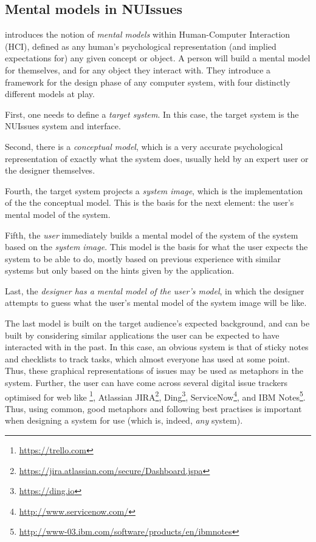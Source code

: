 \subsection{Mental models in NUIssues}

\textcite{wilson-rutherford:mental-models-theory-and-application-in-human-factors:1989} introduces the notion of \textit{mental models} within Human-Computer Interaction (HCI), defined as any human's psychological representation (and implied expectations for) any given concept or object. A person will build a mental model for themselves, and for any object they interact with. They introduce a framework for the design phase of any computer system, with four distinctly different models at play.

First, one needs to define a \textit{target system}. In this case, the target system is the NUIssues system and interface.

Second, there is a \textit{conceptual model}, which is a very accurate psychological representation of exactly what the system does, usually held by an expert user or the designer themselves.

Fourth, the target system projects a \textit{system image}, which is the implementation of the the conceptual model. This is the basis for the next element: the user's mental model of the system.

Fifth, the \textit{user} immediately builds a mental model of the system of the system based on the \textit{system image}. This model is the basis for what the user expects the system to be able to do, mostly based on previous experience with similar systems but only based on the hints given by the application.

Last, the \textit{designer has a mental model of the user's model}, in which the designer attempts to guess what the user's mental model of the system image will be like.

The last model is built on the target audience's expected background, and can be built by considering similar applications the user can be expected to have interacted with in the past. In this case, an obvious system is that of sticky notes and checklists to track tasks, which almost everyone has used at some point. Thus, these graphical representations of issues may be used as metaphors in the system. Further, the user can have come across several digital issue trackers optimised for web like \footnote{\url{https://trello.com}}, Atlassian JIRA\footnote{\url{https://jira.atlassian.com/secure/Dashboard.jspa}}, Ding\footnote{\url{https://ding.io}}, ServiceNow\footnote{\url{http://www.servicenow.com/}}, and IBM Notes\footnote{\url{http://www-03.ibm.com/software/products/en/ibmnotes}}. Thus, using common, good metaphors and following best practises is important when designing a system for use (which is, indeed, \textit{any} system).

